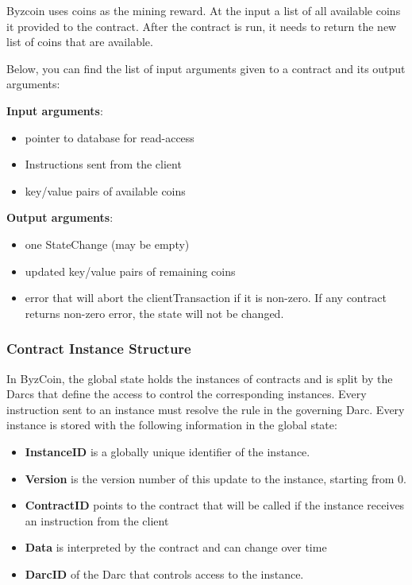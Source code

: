 Byzcoin uses coins as the mining reward. At the input a list of all available coins it provided to the contract. After the contract is run, it needs to return the new list of coins that are available. 

Below, you can find the list of input arguments given to a contract and its output arguments:

\textbf{Input arguments}: 
\begin{itemize}
    \item pointer to database for read-access
    \item Instructions sent from the client
    \item key/value pairs of available coins 
\end{itemize}

\textbf{Output arguments}: 
\begin{itemize}
    \item one StateChange (may be empty)
    \item updated key/value pairs of remaining coins
    \item error that will abort the clientTransaction if it is non-zero. If any contract returns non-zero error, the state will not be changed.
\end{itemize}

\subsubsection{Contract Instance Structure}
In ByzCoin, the global state holds the instances of contracts and is split by the Darcs that define the access to control the corresponding instances. Every instruction sent to an instance must resolve the rule in the governing Darc. Every instance is stored with the following information in the global state:

\begin{itemize}
    \item \textbf{InstanceID} is a globally unique identifier of the instance.
    \item \textbf{Version} is the version number of this update to the instance, starting from 0.
    \item \textbf{ContractID} points to the contract that will be called if the instance receives an instruction from the client
    \item \textbf{Data} is interpreted by the contract and can change over time \item \textbf{DarcID} of the Darc that controls access to the instance.
\end{itemize}

